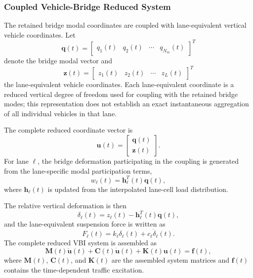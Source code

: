 \documentclass[journal]{IEEEtran}
\begin{document}
\subsubsection{Coupled Vehicle-Bridge Reduced System}

The retained bridge modal coordinates are coupled with lane-equivalent vertical vehicle coordinates. Let
\begin{equation}
\mathbf{q}(t)=\begin{bmatrix}q_1(t)&q_2(t)&\cdots&q_{N_m}(t)\end{bmatrix}^{T}
\end{equation}
denote the bridge modal vector and
\begin{equation}
\mathbf{z}(t)=\begin{bmatrix}z_1(t)&z_2(t)&\cdots&z_L(t)\end{bmatrix}^{T}
\end{equation}
the lane-equivalent vehicle coordinates. Each lane-equivalent coordinate is a reduced vertical degree of freedom used for coupling with the retained bridge modes; this representation does not establish an exact instantaneous aggregation of all individual vehicles in that lane.

The complete reduced coordinate vector is
\begin{equation}
\mathbf{u}(t)=\begin{bmatrix}\mathbf{q}(t)\\\mathbf{z}(t)\end{bmatrix}.
\end{equation}
For lane $\ell$, the bridge deformation participating in the coupling is generated from the lane-specific modal participation terms,
\begin{equation}
w_{\ell}(t)=\mathbf{h}_{\ell}^{T}(t)\mathbf{q}(t),
\end{equation}
where $\mathbf{h}_{\ell}(t)$ is updated from the interpolated lane-cell load distribution.

The relative vertical deformation is then
\begin{equation}
\delta_{\ell}(t)=z_{\ell}(t)-\mathbf{h}_{\ell}^{T}(t)\mathbf{q}(t),
\end{equation}
and the lane-equivalent suspension force is written as
\begin{equation}
F_{\ell}(t)=k_{\ell}\delta_{\ell}(t)+c_{\ell}\dot{\delta}_{\ell}(t).
\end{equation}
The complete reduced VBI system is assembled as
\begin{equation}
\mathbf{M}(t)\ddot{\mathbf{u}}(t)+\mathbf{C}(t)\dot{\mathbf{u}}(t)+\mathbf{K}(t)\mathbf{u}(t)=\mathbf{f}(t),
\end{equation}
where $\mathbf{M}(t)$, $\mathbf{C}(t)$, and $\mathbf{K}(t)$ are the assembled system matrices and $\mathbf{f}(t)$ contains the time-dependent traffic excitation.
\end{document}
